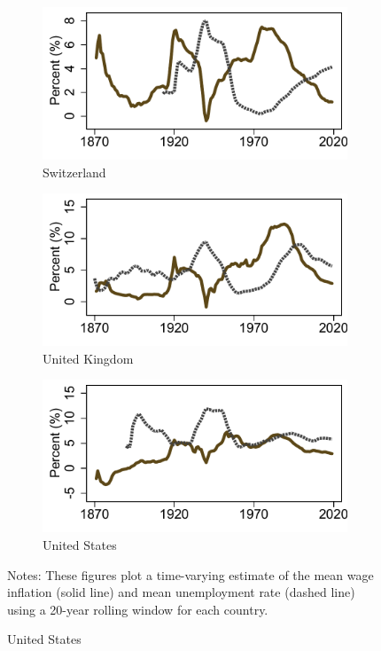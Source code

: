 \documentclass[12pt]{article}
\newcommand{\annote}[1]{\parbox{\textwidth}{\renewcommand{\baselinestretch}{1.0}\vspace{12pt} \footnotesize Notes: #1}}
\begin{document}
\begin{appendices}
\begin{singlespace}
\begin{figure}[ht]
\begin{subfigure}[b]{0.30\textwidth}
    \end{subfigure} 
    \begin{subfigure}[b]{0.30\textwidth}
    \caption*{Switzerland}
    \includegraphics[width=\textwidth]{../Output/Figures/Median_dwn_unemp_Switzerland.pdf}   
    \end{subfigure} 
    \begin{subfigure}[b]{0.30\textwidth}
    \caption*{United Kingdom}
    \includegraphics[width=\textwidth]{../Output/Figures/Median_dwn_unemp_UK.pdf}   
    \end{subfigure}
    \begin{subfigure}[b]{0.30\textwidth}
    \caption*{United States}
    \includegraphics[width=\textwidth]{../Output/Figures/Median_dwn_unemp_USA.pdf}   
    \end{subfigure} 
    \annote{\footnotesize These figures plot a time-varying estimate of the mean wage inflation (solid line) and mean unemployment rate (dashed line) using a 20-year rolling window for each country.}
\end{figure}



\end{singlespace}
\end{appendices}
\end{document}
